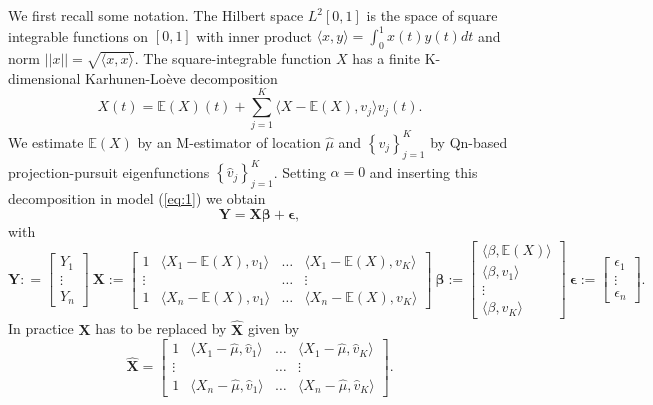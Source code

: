 \documentclass[11pt]{article}
\begin{document}
We first recall some notation. The Hilbert space $L^2[0,1]$ is the space of square integrable functions on $[0,1]$ with inner product $\langle x, y \rangle = \int_{0}^1 x(t) y(t) dt$ and norm $||x|| = \sqrt{\langle x, x \rangle  }$. The square-integrable function $X$ has a finite K-dimensional Karhunen-Loève decomposition
\begin{equation*}
X(t) = \mathbb{E}(X)(t)+  \sum_{j=1}^K \langle X -\mathbb{E}(X), v_j \rangle v_j(t).
\end{equation*}
We estimate $\mathbb{E}(X)$ by an M-estimator of location $\widehat{\mu}$  and $\left\{ v_j \right\}_{j=1}^K$ by Qn-based projection-pursuit eigenfunctions $\left\{ \widehat{v}_j \right\}_{j=1}^K$. Setting $\alpha = 0$ and inserting this decomposition in model (\ref{eq:1}) we obtain
\begin{equation*}
\mathbf{Y} = \mathbf{X} \boldsymbol{\beta} + \boldsymbol{\epsilon},
\end{equation*}
with 
\begin{equation*}
\mathbf{Y} : = \begin{bmatrix}
Y_1 \\  \vdots \\  Y_n
\end{bmatrix} \ \mathbf{X} := \begin{bmatrix}
1 & \langle X_1 -\mathbb{E}(X), v_1 \rangle  &  \ldots & \langle X_1 -\mathbb{E}(X), v_K \rangle \\ \vdots &  & \ldots & \vdots  \\ 1 &  \langle X_n-\mathbb{E}(X), v_1 \rangle  &  \ldots & \langle X_n-\mathbb{E}(X), v_K \rangle 
\end{bmatrix} \  \boldsymbol{\beta} :=  \begin{bmatrix}
\langle \beta, \mathbb{E}(X) \rangle  \\ \langle \beta, v_1 \rangle \\ \vdots \\ \langle \beta ,  v_K \rangle
\end{bmatrix} \ \boldsymbol{\epsilon} :=  \begin{bmatrix}
\epsilon_1 \\ \vdots \\  \epsilon_n
\end{bmatrix}.
\end{equation*}
In practice $\mathbf{X}$ has to be replaced by $\widehat{\mathbf{X}}$ given by
\begin{equation*}
\mathbf{\widehat{X}} = \begin{bmatrix}
1 & \langle X_1 -\widehat{\mu}, \widehat{v}_1 \rangle  &  \ldots & \langle X_1 -\widehat{\mu}, \widehat{v}_K \rangle \\ \vdots &  &\ldots & \vdots  \\ 1 &  \langle X_n-\widehat{\mu}, \widehat{v}_1 \rangle  &  \ldots & \langle X_n-\widehat{\mu}, \widehat{v}_K \rangle 
\end{bmatrix}.
\end{equation*}
\end{document}
